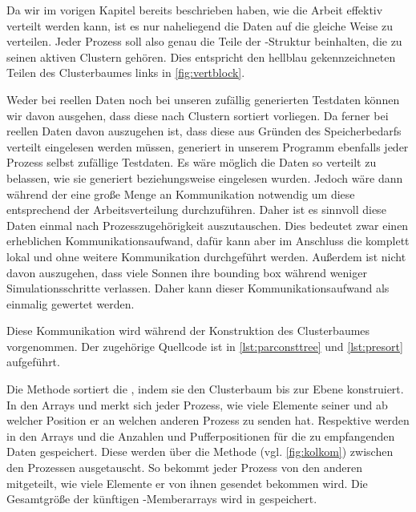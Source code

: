     Da wir im vorigen Kapitel bereits beschrieben haben, wie die Arbeit effektiv verteilt werden kann, ist es nur naheliegend die Daten auf die gleiche Weise zu verteilen. Jeder Prozess soll also 
    genau die Teile der -Struktur beinhalten, die zu seinen aktiven Clustern gehören. Dies entspricht den hellblau gekennzeichneten Teilen des Clusterbaumes links in \autoref{fig:vertblock}.
    
    Weder bei reellen Daten noch bei unseren zufällig generierten Testdaten können wir davon ausgehen, dass diese nach Clustern sortiert vorliegen. Da ferner bei reellen Daten davon auszugehen
    ist, dass diese aus Gründen des Speicherbedarfs verteilt eingelesen werden müssen, generiert in unserem Programm ebenfalls jeder Prozess selbst zufällige Testdaten. Es wäre möglich die Daten 
    so verteilt zu belassen, wie sie generiert beziehungsweise eingelesen wurden. Jedoch wäre dann während der \vorruck eine große Menge an Kommunikation notwendig um diese entsprechend der 
    Arbeitsverteilung durchzuführen. Daher ist es sinnvoll diese Daten einmal nach Prozesszugehörigkeit auszutauschen. Dies bedeutet zwar einen erheblichen Kommunikationsaufwand, dafür kann aber im
    Anschluss die \vorruck komplett lokal und ohne weitere Kommunikation durchgeführt werden. Außerdem ist nicht davon auszugehen, dass viele Sonnen ihre bounding box während weniger Simulationsschritte
    verlassen. Daher kann dieser Kommunikationsaufwand als einmalig gewertet werden.
    
    Diese Kommunikation wird während der Konstruktion des Clusterbaumes vorgenommen. Der zugehörige Quellcode ist in \autoref{lst:parconsttree} und \autoref{lst:presort} aufgeführt.
    
    Die Methode  sortiert die , indem sie den Clusterbaum bis zur Ebene  konstruiert. In den Arrays  und 
    merkt sich jeder Prozess, wie viele Elemente seiner  und ab welcher Position er an welchen anderen Prozess zu senden hat. Respektive werden in den Arrays  
    und  die Anzahlen und Pufferpositionen für die zu empfangenden Daten gespeichert. Diese werden über die Methode  (vgl. \autoref{fig:kolkom}) zwischen 
    den Prozessen ausgetauscht. So bekommt jeder Prozess von den anderen mitgeteilt, wie viele Elemente er von ihnen gesendet bekommen wird. Die Gesamtgröße der künftigen -Memberarrays
    wird in  gespeichert.
    
